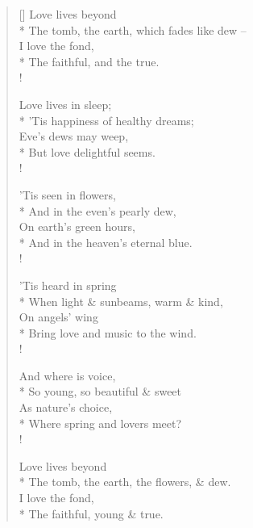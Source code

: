 \documentclass[MAIN]{subfiles}
\begin{document}
\settowidth{\versewidth}{The tomb, the earth, which fades like dew --}
\begin{verse}[\versewidth]
\vin Love lives beyond\\* 
The tomb, the earth, which fades like dew --\\
\vin I love the fond,\\*
The faithful, and the true.\\!

\vin Love lives in sleep;\\*
'Tis happiness of healthy dreams;\\
\vin Eve's dews may weep,\\*
But love delightful seems.\\!

\vin 'Tis seen in flowers,\\*
And in the even's pearly dew,\\
\vin On earth's green hours,\\*
And in the heaven's eternal blue.\\!

\vin 'Tis heard in spring\\*
When light \& sunbeams, warm \& kind,\\
\vin On angels' wing\\*
Bring love and music to the wind.\\!

\vin And where is voice,\\*
So young, so beautiful \& sweet\\
\vin As nature's choice,\\*
Where spring and lovers meet?\\!

\vin Love lives beyond\\*
The tomb, the earth, the flowers, \& dew.\\
\vin I love the fond,\\*
The faithful, young \& true.
\end{verse}
\end{document}
